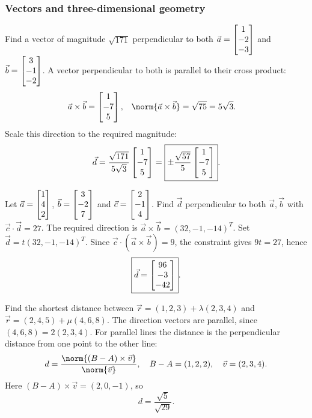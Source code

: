 \renewcommand{\theequation}{1.2.\arabic{qcurrent}.\arabic{equation}}

\subsubsection{Vectors and three-dimensional geometry}
\begin{enumerate}[label={},leftmargin=0pt,itemsep=9pt]
 Find a vector of magnitude $\sqrt{171}$ perpendicular to both $\vec a=\myvec{1\\-2\\-3}$ and $\vec b=\myvec{3\\-1\\-2}$.
\solution A vector perpendicular to both is parallel to their cross product:
\begin{align}
\vec a\times\vec b&=\myvec{1\\-7\\5},&\norm{\vec a\times\vec b}&=\sqrt{75}=5\sqrt3.
\end{align}
Scale this direction to the required magnitude:
\[
\vec d=\frac{\sqrt{171}}{5\sqrt3}\myvec{1\\-7\\5}
=\boxed{\pm\frac{\sqrt{57}}5\myvec{1\\-7\\5}}.
\]

 Let $\vec a=\myvec{1\\4\\2}$, $\vec b=\myvec{3\\-2\\7}$ and $\vec c=\myvec{2\\-1\\4}$. Find $\vec d$ perpendicular to both $\vec a,\vec b$ with $\vec c\cdot\vec d=27$.
\solution The required direction is $\vec a\times\vec b=(32,-1,-14)^T$. Set $\vec d=t(32,-1,-14)^T$. Since $\vec c\cdot(\vec a\times\vec b)=9$, the constraint gives $9t=27$, hence
\[
\boxed{\vec d=\myvec{96\\-3\\-42}}.
\]

 Find the shortest distance between $\vec r=(1,2,3)+\lambda(2,3,4)$ and $\vec r=(2,4,5)+\mu(4,6,8)$.
\solution The direction vectors are parallel, since $(4,6,8)=2(2,3,4)$. For parallel lines the distance is the perpendicular distance from one point to the other line:
\[
d=\frac{\norm{(B-A)\times\vec v}}{\norm{\vec v}},\quad B-A=(1,2,2),\quad \vec v=(2,3,4).
\]
Here $(B-A)\times\vec v=(2,0,-1)$, so
\[
\boxed{d=\frac{\sqrt5}{\sqrt{29}}}.
\]

\end{enumerate}

